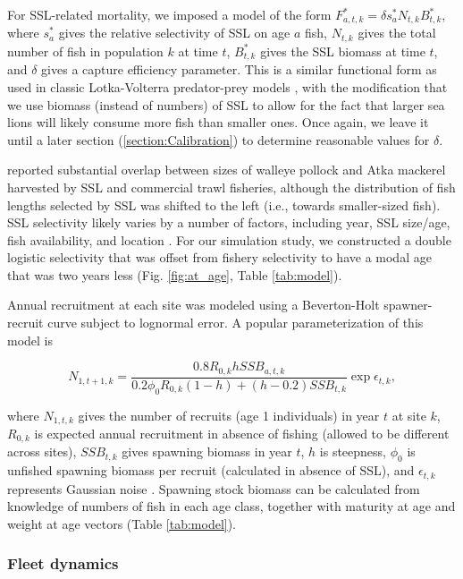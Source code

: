 \documentclass[nonumbib,leqno]{nrc1}
\begin{document}
For SSL-related mortality, we imposed a model of the form $F_{a,t,k}^*=\delta s_a^* N_{t,k} B_{t,k}^*$, where $s_a^*$ gives the relative selectivity of SSL on age $a$ fish, $N_{t,k}$ gives the total number of fish in population $k$ at time $t$, $B_{t,k}^*$ gives the SSL biomass at time $t$, and $\delta$ gives a capture efficiency parameter. This is a similar functional form as used in classic Lotka-Volterra predator-prey models \citep[see e.g.][]{Gotelli2001}, with the modification that we use biomass (instead of numbers) of SSL to allow for the fact that larger sea lions will likely consume more fish than smaller ones.  Once again, we leave it until a later section (\ref{section:Calibration}) to determine reasonable values for $\delta$.

\citet{ZeppelinEtAl2004} reported substantial overlap between sizes of walleye pollock and Atka mackerel harvested by SSL and commercial trawl fisheries, although the distribution of fish lengths selected by SSL was shifted to the left (i.e., towards smaller-sized fish).  SSL selectivity likely varies by a number of factors, including year, SSL size/age, fish availability, and location \citep{ZeppelinEtAl2004}.  For our simulation study, we constructed a double logistic selectivity that was offset from fishery selectivity to have a modal age that was two years less (Fig. \ref{fig:at_age}, Table \ref{tab:model}).

Annual recruitment at each site was modeled using a Beverton-Holt spawner-recruit curve subject to lognormal error.  A popular parameterization of this model is
\begin{linenomath}
\begin{equation*}
N_{1,t+1,k} = \frac{0.8 R_{0,k} h SSB_{a,t,k}}{0.2 \phi_0 R_{0,k}(1-h)+(h-0.2)SSB_{t,k}} \exp{\epsilon_{t,k}},
\end{equation*}
\end{linenomath}
where $N_{1,t,k}$ gives the number of recruits (age 1 individuals) in year $t$ at site $k$, $R_{0,k}$ is expected annual recruitment in absence of fishing (allowed to be different across sites), $SSB_{t,k}$ gives spawning biomass in year $t$, $h$ is steepness, $\phi_0$ is unfished spawning biomass per recruit (calculated in absence of SSL), and $\epsilon_{t,k}$ represents Gaussian noise \citep{Mace1988}.  Spawning stock biomass can be calculated from knowledge of numbers of fish in each age class, together with maturity at age and weight at age vectors (Table \ref{tab:model}).

\subsubsection{Fleet dynamics}
\label{section:Fleet}
\end{document}
